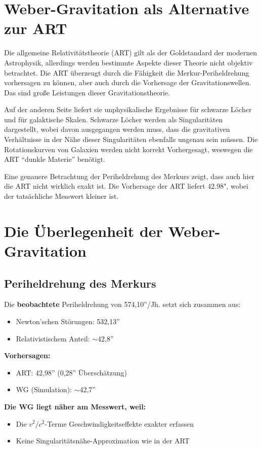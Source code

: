 \section{Weber-Gravitation als Alternative zur ART}
Die allgemeine Relativitätstheorie (ART) gilt als der Goldstandard der modernen Astrophysik, allerdings werden bestimmte Aspekte dieser Theorie
nicht objektiv betrachtet. Die ART überzeugt durch die Fähigkeit die Merkur-Periheldrehung vorhersagen zu können, aber auch durch die Vorhersage
der Gravitationswellen. Das sind große Leistungen dieser Gravitationstheorie.

Auf der anderen Seite liefert sie unphysikalische Ergebnisse für schwarze Löcher und für galaktische Skalen. Schwarze Löcher werden als Singularitäten
dargestellt, wobei davon ausgegangen werden muss, dass die gravitativen Verhältnisse in der Nähe dieser Singularitäten ebenfalls ungenau sein müssen. Die
Rotationskurven von Galaxien werden nicht korrekt Vorhergesagt, weswegen die ART \enquote{dunkle Materie} benötigt.

Eine genauere Betrachtung der Periheldrehung des Merkurs zeigt, dass auch hier die ART nicht wirklich exakt ist. Die Vorhersage der ART liefert 42.98", wobei
der tatsächliche Messwert kleiner ist.

\section{Die Überlegenheit der Weber-Gravitation}

\subsection{Periheldrehung des Merkurs}
Die \textbf{beobachtete} Periheldrehung von 574,10''/Jh. setzt sich zusammen aus:
\begin{itemize}
\item Newton'schen Störungen: 532,13''
\item Relativistischem Anteil: $\sim$42,8''
\end{itemize}

\textbf{Vorhersagen:}
\begin{itemize}
\item ART: 42,98'' (0,28'' Überschätzung)
\item WG (Simulation): $\sim$42,7''
\end{itemize}

\textbf{Die WG liegt näher am Messwert, weil:}
\begin{itemize}
\item Die $v^2/c^2$-Terme Geschwindigkeitseffekte exakter erfassen
\item Keine Singularitätsnähe-Approximation wie in der ART
\end{itemize}

